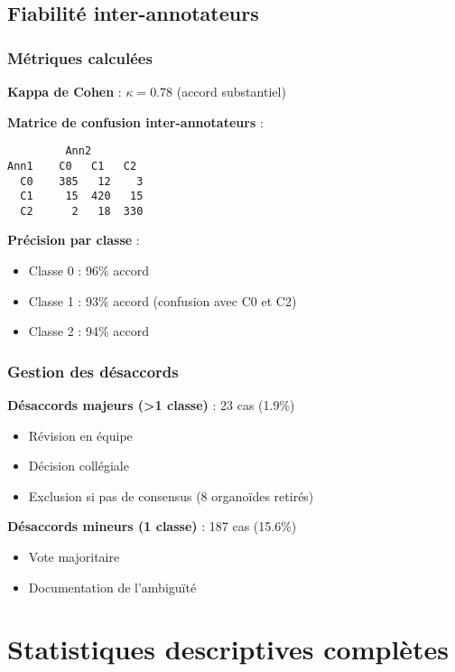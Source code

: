 \subsection{Fiabilité inter-annotateurs}

\subsubsection{Métriques calculées}

\textbf{Kappa de Cohen} : $\kappa = 0.78$ (accord substantiel)

\textbf{Matrice de confusion inter-annotateurs} :
\begin{verbatim}
         Ann2
Ann1    C0   C1   C2
  C0    385   12    3
  C1     15  420   15
  C2      2   18  330
\end{verbatim}

\textbf{Précision par classe} :
\begin{itemize}
    \item Classe 0 : 96\% accord
    \item Classe 1 : 93\% accord (confusion avec C0 et C2)
    \item Classe 2 : 94\% accord
\end{itemize}

\subsubsection{Gestion des désaccords}

\textbf{Désaccords majeurs (>1 classe)} : 23 cas (1.9\%)
\begin{itemize}
    \item Révision en équipe
    \item Décision collégiale
    \item Exclusion si pas de consensus (8 organoïdes retirés)
\end{itemize}

\textbf{Désaccords mineurs (1 classe)} : 187 cas (15.6\%)
\begin{itemize}
    \item Vote majoritaire
    \item Documentation de l'ambiguïté
\end{itemize}

\section{Statistiques descriptives complètes}

